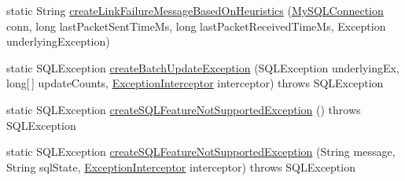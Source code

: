 \begin{DoxyCompactItemize}
static String \mbox{\hyperlink{classcom_1_1mysql_1_1jdbc_1_1_s_q_l_error_aec56b8765db8fe95f318c0b867570303}{create\+Link\+Failure\+Message\+Based\+On\+Heuristics}} (\mbox{\hyperlink{interfacecom_1_1mysql_1_1jdbc_1_1_my_s_q_l_connection}{My\+S\+Q\+L\+Connection}} conn, long last\+Packet\+Sent\+Time\+Ms, long last\+Packet\+Received\+Time\+Ms, Exception underlying\+Exception)
\item 
static S\+Q\+L\+Exception \mbox{\hyperlink{classcom_1_1mysql_1_1jdbc_1_1_s_q_l_error_a679aee33cf253b786dfc70bbd1631e88}{create\+Batch\+Update\+Exception}} (S\+Q\+L\+Exception underlying\+Ex, long\mbox{[}$\,$\mbox{]} update\+Counts, \mbox{\hyperlink{interfacecom_1_1mysql_1_1jdbc_1_1_exception_interceptor}{Exception\+Interceptor}} interceptor)  throws S\+Q\+L\+Exception 
\item 
static S\+Q\+L\+Exception \mbox{\hyperlink{classcom_1_1mysql_1_1jdbc_1_1_s_q_l_error_ac3aaaa79ef0f07281c6f5eb0e94d57fc}{create\+S\+Q\+L\+Feature\+Not\+Supported\+Exception}} ()  throws S\+Q\+L\+Exception 
\item 
static S\+Q\+L\+Exception \mbox{\hyperlink{classcom_1_1mysql_1_1jdbc_1_1_s_q_l_error_a241d72860d674814bc83a26a4c0a324e}{create\+S\+Q\+L\+Feature\+Not\+Supported\+Exception}} (String message, String sql\+State, \mbox{\hyperlink{interfacecom_1_1mysql_1_1jdbc_1_1_exception_interceptor}{Exception\+Interceptor}} interceptor)  throws S\+Q\+L\+Exception 
\end{DoxyCompactItemize}
